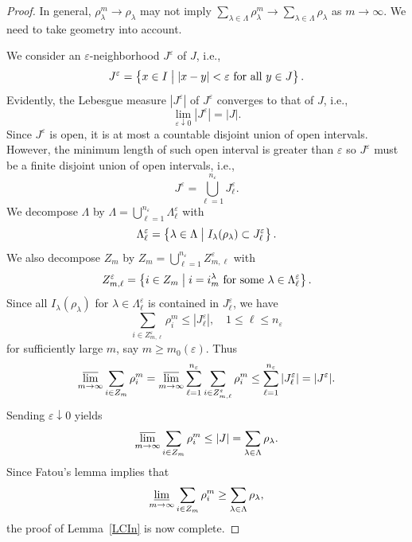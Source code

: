 \documentclass[12pt, reqno]{amsart}
\numberwithin{equation}{section}
\begin{document}
\begin{proof}
In general, $\rho_\lambda^m\to\rho_\lambda$ may not imply $\sum_{\lambda\in\Lambda}\rho_\lambda^m\to\sum_{\lambda\in\Lambda}\rho_\lambda$ as $m\to\infty$.
 We need to take geometry into account.

We consider an $\varepsilon$-neighborhood $J^\varepsilon$ of $J$, i.e.,
\[
    J^\varepsilon = \left\{ x \in I \bigm|
    |x-y|<\varepsilon\ \text{for all}\ y\in J \right\}.
\]
Evidently, the Lebesgue measure $|J^\varepsilon|$ of $J^\varepsilon$ converges to that of $J$, i.e.,
\[
    \lim_{\varepsilon\downarrow0} |J^\varepsilon| = |J|.
\]
Since $J^\varepsilon$ is open, it is at most a countable disjoint union of open intervals.
 However, the minimum length of such open interval is greater than $\varepsilon$ so $J^\varepsilon$ must be a finite disjoint union of open intervals, i.e.,
\[
    J^\varepsilon = \bigcup_{\ell=1}^{n_\varepsilon} J_\ell^\varepsilon.
\]
We decompose $\Lambda$ by $\Lambda=\bigcup_{\ell=1}^{n_\varepsilon}\Lambda_\ell^\varepsilon$ with
\[
    \Lambda_\ell^\varepsilon = \left\{ \lambda \in \Lambda \bigm|
    I_\lambda(\rho_\lambda) \subset J_\ell^\varepsilon \right\}.
\]
We also decompose $Z_m$ by $Z_m=\bigcup_{\ell=1}^{n_\varepsilon}Z_{m,\ell}^\varepsilon$ with
\[
    Z_{m,\ell}^\varepsilon = \left\{ i \in Z_m \bigm|
    i=i_m^\lambda \ \text{for some}\  \lambda \in \Lambda_\ell^\varepsilon \right\}.
\]
Since all $I_\lambda(\rho_\lambda)$ for $\lambda\in\Lambda_\ell^\varepsilon$ is contained in $J_\ell^\varepsilon$, we have
\[
    \sum_{i\in Z_{m,\ell}^\varepsilon} \rho_i^m
    \le |J_\ell^\varepsilon|, \quad
    1 \le \ell \le n_\varepsilon
\]
for sufficiently large $m$, say $m\ge m_0(\varepsilon)$.
 Thus
\[
    \varlimsup_{m\to\infty} \sum_{i\in Z_m} \rho_i^m
    = \varlimsup_{m\to\infty} \sum_{\ell=1}^{n_\varepsilon} \sum_{i\in Z_{m,\ell}^\varepsilon} \rho_i^m
    \le \sum_{\ell=1}^{n_\varepsilon} |J_\ell^\varepsilon| = |J^\varepsilon|.
\]
Sending $\varepsilon\downarrow0$ yields
\[
    \varlimsup_{m\to\infty} \sum_{i\in Z_m} \rho_i^m
    \le |J| = \sum_{\lambda\in\Lambda} \rho_\lambda.
\]
Since Fatou's lemma implies that
\[
    \varliminf_{m\to\infty} \sum_{i\in Z_m} \rho_i^m
    \ge \sum_{\lambda\in\Lambda} \rho_\lambda,
\]
the proof of Lemma~\ref{LCIn} is now complete.
\end{proof}
\end{document}
